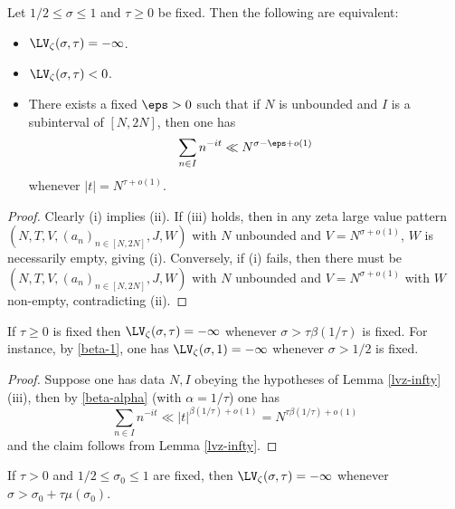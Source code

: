 \begin{lemma}\label{lvz-infty}  Let $1/2 \leq \sigma \leq 1$ and $\tau \geq 0$ be fixed. Then the following are equivalent:
    \begin{itemize}
        \item[(i)] $\LV_\zeta(\sigma,\tau)=-\infty$.
        \item[(ii)] $\LV_\zeta(\sigma,\tau) < 0$.
        \item[(iii)] There exists a fixed $\eps>0$ such that if $N$ is unbounded and $I$ is a subinterval of $[N, 2N]$, then one has
              $$ \sum_{n \in I} n^{-it} \ll N^{\sigma-\eps+o(1)}$$
              whenever $|t| = N^{\tau+o(1)}$.
    \end{itemize}
\end{lemma}

\begin{proof} Clearly (i) implies (ii).
    If (iii) holds, then in any zeta large value pattern
    $(N,T,V,(a_n)_{n \in [N,2N]},J,W)$ with $N$ unbounded and $V = N^{\sigma+o(1)}$, $W$ is necessarily empty, giving (i). Conversely, if (i) fails, then there must be $(N,T,V,(a_n)_{n \in [N,2N]},J,W)$ with $N$ unbounded and $V = N^{\sigma+o(1)}$ with $W$ non-empty, contradicting (ii).
\end{proof}

\begin{corollary}\label{beta-zeta-vanish}  If $\tau \geq 0$ is fixed then $\LV_\zeta(\sigma,\tau) = -\infty$ whenever $\sigma > \tau \beta(1/\tau)$ is fixed. For instance, by \eqref{beta-1}, one has $\LV_\zeta(\sigma,1)=-\infty$ whenever $\sigma > 1/2$ is fixed.
\end{corollary}

\begin{proof} Suppose one has data $N, I$  obeying the hypotheses of Lemma \ref{lvz-infty}(iii), then by \eqref{beta-alpha} (with $\alpha = 1/\tau$) one has
    $$ \sum_{n \in I} n^{-it} \ll |t|^{\beta(1/\tau)+o(1)} = N^{\tau \beta(1/\tau)+o(1)}$$
    and the claim follows from Lemma \ref{lvz-infty}.
\end{proof}

\begin{corollary}\label{lvz-mu}  If $\tau > 0$ and $1/2 \leq \sigma_0 \leq 1$ are fixed, then $\LV_\zeta(\sigma,\tau) = -\infty$ whenever $\sigma > \sigma_0 + \tau \mu(\sigma_0)$.
\end{corollary}

